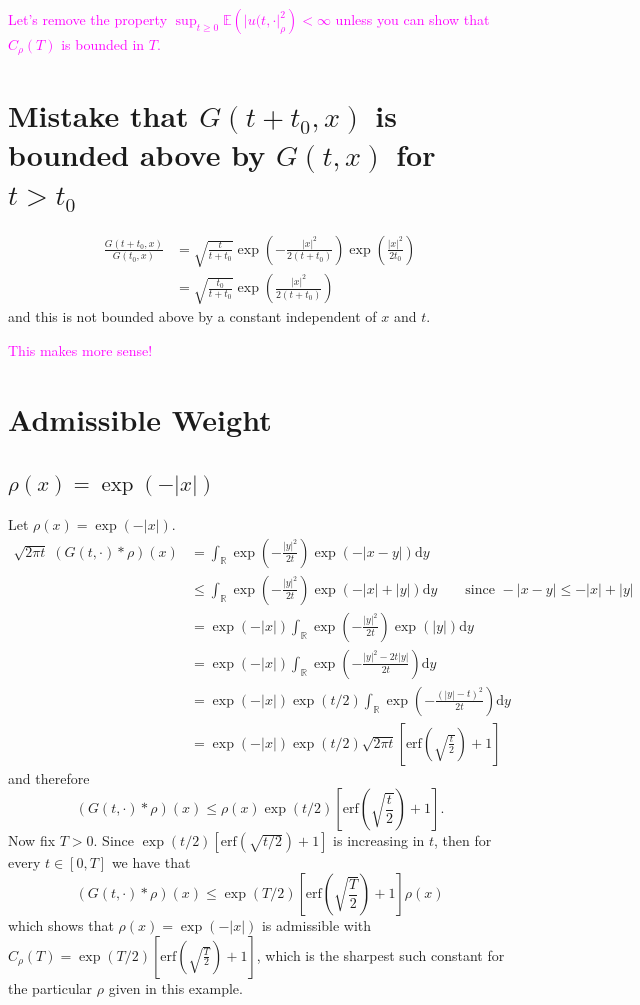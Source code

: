 \documentclass{article}
\numberwithin{equation}{section}
\newcommand{\R}{\mathbb{R}}
\newcommand{\E}{\mathbb{E}}
\newcommand{\ud}{\ensuremath{\mathrm{d}}}
\begin{document}
\textcolor{magenta}{Let's remove the property $\sup_{t\ge 0}\E\left(\left|u(t,\cdot\right|_\rho^2\right)<\infty$ unless you can show that $C_\rho(T)$ is bounded in $T$.}

\section{Mistake that $G(t+t_0,x)$ is bounded above by $G(t,x)$ for $t > t_0$}

\begin{align*}
	\frac{G(t+t_0,x)}{G(t_0,x)} &= \sqrt{\frac{t}{t+t_0}}\exp\left(-\frac{|x|^2}{2(t+t_0)}\right)\exp\left(\frac{|x|^2}{2t_0}\right)
	\\& = \sqrt{\frac{t_0}{t+t_0}} \exp\left(\frac{|x|^2}{2(t+t_0)}\right)
\end{align*}
and this is not bounded above by a constant independent of $x$ and $t$.

\bigskip
\textcolor{magenta}{This makes more sense!}

\section{Admissible Weight}
\subsection{$\rho(x) = \exp(-|x|)$}

Let $\rho(x) = \exp(-|x|)$.
\begin{align*}
\sqrt{2\pi t} \; (G(t,\cdot) * \rho)(x) &= \int_{\R} \exp\left(-\frac{|y|^2}{2t} \right) \exp\left( -|x-y| \right) \ud y
\\& \le \int_{\R} \exp\left(-\frac{|y|^2}{2t} \right) \exp\left( -|x| +|y| \right) \ud y \quad \quad \text{since } -|x-y| \le -|x| + |y|
\\& = \exp(-|x|) \int_{\R} \exp\left(-\frac{|y|^2}{2t} \right) \exp\left( |y| \right) \ud y
\\& = \exp(-|x|) \int_{\R} \exp\left(-\frac{|y|^2 - 2t|y|}{2t} \right) \ud y
\\& = \exp(-|x|) \exp(t/2) \int_{\R} \exp\left(-\frac{(|y|-t)^2 }{2t} \right) \ud y
\\& =\exp(-|x|) \exp(t/2)  \sqrt{2\pi t} \left[ \text{erf}\left(\sqrt{\frac{t}{2}}\right) +1 \right]
\end{align*}
and therefore
\[
(G(t,\cdot) * \rho)(x) \le \rho(x)\exp(t/2) \left[ \text{erf}\left(\sqrt{\frac{t}{2}}\right) +1 \right].
\]
Now fix $T>0$. Since $\exp(t/2)\left[ \text{erf}\left(\sqrt{t/2}\right) +1 \right]$ is increasing in $t$, then for every $t\in [0,T]$ we have that
\[
(G(t,\cdot) * \rho)(x) \le \exp(T/2)\left[ \text{erf}\left(\sqrt{\frac{T}{2}}\right) +1 \right]  \rho(x)
\]
which shows that $\rho(x) = \exp(-|x|)$ is admissible with $C_\rho(T) = \exp(T/2)\left[ \text{erf}\left(\sqrt{\frac{T}{2}}\right) +1 \right]$, which is the sharpest such constant for the particular $\rho$ given in this example.
\end{document}
